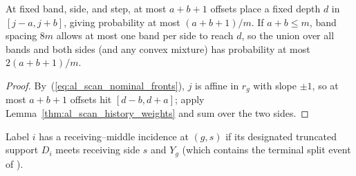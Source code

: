\begin{lemma}
    \label{thm:al_scan_offset_count}
    \leanok
    At fixed band, side, and step, at most $a+b+1$ offsets place a fixed depth
    $d$ in $[j-a,j+b]$, giving probability at most $(a+b+1)/m$. If $a+b\le m$,
    band spacing $8m$ allows at most one band per side to reach $d$, so the
    union over all bands and both sides (and any convex mixture) has
    probability at most $2(a+b+1)/m$.
\end{lemma}
\begin{proof}\leanok
    By~(\ref{eq:al_scan_nominal_fronts}), $j$ is affine in $r_g$ with slope
    $\pm1$, so at most $a+b+1$ offsets hit $[d-b,d+a]$; apply
    Lemma~\ref{thm:al_scan_history_weights} and sum over the two sides.
\end{proof}

\begin{definition}
    \label{def:al_scan_designated_incidence}
    \leanok
    Label $i$ has a receiving--middle incidence at $(g,s)$ if its designated
    truncated support $D_i$ meets receiving side $s$ and $Y_g$ (which contains
    the terminal split event of \cite[Section~7]{OpenAI2026AreaLaw}).
\end{definition}

